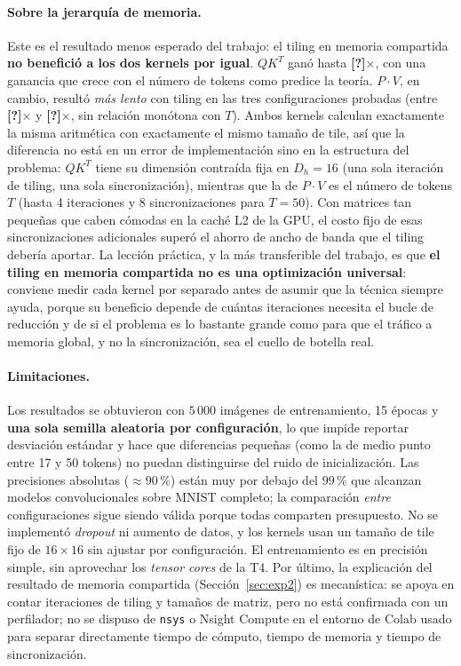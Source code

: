 \documentclass[11pt,a4paper]{article}
\providecommand{\KpiSpeedupAtMax}{\textbf{[?]}}
\providecommand{\KpiPxVSpeedupMin}{\textbf{[?]}}
\providecommand{\KpiPxVSpeedupMax}{\textbf{[?]}}
\begin{document}
\paragraph{Sobre la jerarquía de memoria.} Este es el resultado menos esperado
del trabajo: el tiling en memoria compartida \textbf{no benefició a los dos
kernels por igual}. $QK^{T}$ ganó hasta \KpiSpeedupAtMax$\times$, con una
ganancia que crece con el número de tokens como predice la teoría. $P\cdot V$,
en cambio, resultó \emph{más lento} con tiling en las tres configuraciones
probadas (entre \KpiPxVSpeedupMin$\times$ y \KpiPxVSpeedupMax$\times$, sin
relación monótona con $T$). Ambos kernels calculan
exactamente la misma aritmética con exactamente el mismo tamaño de tile, así
que la diferencia no está en un error de implementación sino en la estructura
del problema: $QK^{T}$ tiene su dimensión contraída fija en $D_h=16$ (una sola
iteración de tiling, una sola sincronización), mientras que la de $P\cdot V$ es
el número de tokens $T$ (hasta 4 iteraciones y 8 sincronizaciones para $T=50$).
Con matrices tan pequeñas que caben cómodas en la caché L2 de la GPU, el costo
fijo de esas sincronizaciones adicionales superó el ahorro de ancho de banda que
el tiling debería aportar. La lección práctica, y la más transferible del
trabajo, es que \textbf{el tiling en memoria compartida no es una
optimización universal}: conviene medir cada kernel por separado antes de
asumir que la técnica siempre ayuda, porque su beneficio depende de cuántas
iteraciones necesita el bucle de reducción y de si el problema es lo bastante
grande como para que el tráfico a memoria global, y no la sincronización, sea
el cuello de botella real.

\paragraph{Limitaciones.} Los resultados se obtuvieron con $5\,000$ imágenes de
entrenamiento, 15 épocas y \textbf{una sola semilla aleatoria por
configuración}, lo que impide reportar desviación estándar y hace que
diferencias pequeñas (como la de medio punto entre 17 y 50 tokens) no puedan
distinguirse del ruido de inicialización. Las precisiones absolutas
($\approx 90$\,\%) están muy por debajo del $99$\,\% que alcanzan modelos
convolucionales sobre MNIST completo; la comparación \emph{entre}
configuraciones sigue siendo válida porque todas comparten presupuesto. No se
implementó \emph{dropout} ni aumento de datos, y los kernels usan un tamaño de
tile fijo de $16\times16$ sin ajustar por configuración. El entrenamiento es en
precisión simple, sin aprovechar los \emph{tensor cores} de la T4. Por último,
la explicación del resultado de memoria compartida (Sección~\ref{sec:exp2}) es
mecanística: se apoya en contar iteraciones de tiling y tamaños de matriz,
pero no está confirmada con un perfilador; no se dispuso de \texttt{nsys} o
Nsight Compute en el entorno de Colab usado para separar directamente tiempo de
cómputo, tiempo de memoria y tiempo de sincronización.
\end{document}
